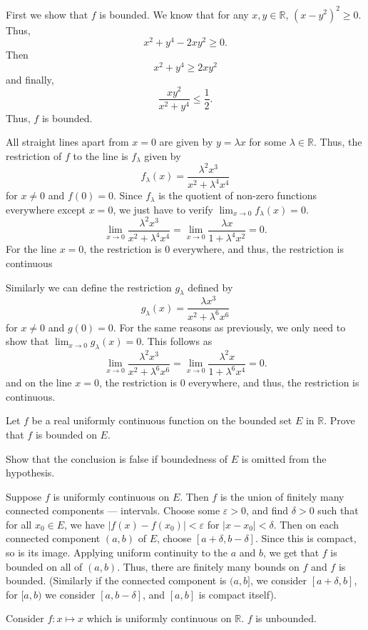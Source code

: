 \documentclass[12 pt, letterpaper]{hmcpset}
\begin{document}
\begin{solution}
	First we show that $f$ is bounded. We know that for any $x, y \in \mathbb{R}$, $(x - y^{2})^{2} \ge 0$. Thus,
	\[
		x^{2} + y^{4} - 2 x y^{2} \ge 0.
	\]
	Then
	\[
		x^{2} + y^{4} \ge 2 x y^{2}
	\]
	and finally,
	\[
		\frac{x y^{2}}{x^{2} + y^{4}} \le \frac{1}{2}.
	\]
	Thus, $f$ is bounded.

	All straight lines apart from $x = 0$ are given by $y = \lambda x$ for some $\lambda \in \mathbb{R}$. Thus, the restriction of $f$ to the line is $f_{\lambda}$ given by
	\[
		f_{\lambda}(x) = \frac{\lambda^{2} x^{3}}{x^{2} + \lambda^{4} x^{4}}
	\]
	for $x \neq 0$ and $f(0) = 0$. Since $f_{\lambda}$ is the quotient of non-zero functions everywhere except $x = 0$, we just have to verify $\lim_{x \to 0} f_{\lambda}(x) = 0$.
	\begin{equation*}
		\lim_{x \to 0} \frac{\lambda^{2} x^{3}}{x^{2} + \lambda^{4} x^{4}} = \lim_{x \to 0} \frac{\lambda x}{1 + \lambda^{4} x^{2}} = 0.
	\end{equation*}
	For the line $x = 0$, the restriction is $0$ everywhere, and thus, the restriction is continuous

	Similarly we can define the restriction $g_{\lambda}$ defined by
	\[
		g_{\lambda}(x) = \frac{\lambda x^{3}}{x^{2} + \lambda^{6} x^{6}}
	\]
	for $x \neq 0$ and $g(0) = 0$. For the same reasons as previously, we only need to show that $\lim_{x \to 0} g_{\lambda}(x) = 0$. This follows as
	\[
		\lim_{x \to 0} \frac{\lambda^{2} x^{3}}{x^{2} + \lambda^{6} x^{6}} = \lim_{x \to 0} \frac{\lambda^{2} x}{1 + \lambda^{6} x^{4}} = 0.
	\]
	and on the line $x = 0$, the restriction is $0$ everywhere, and thus, the restriction is continuous.
\end{solution}

\pagebreak

\begin{problem}
	Let $f$ be a real uniformly continuous function on the bounded set $E$ in $\mathbb{R}$. Prove that $f$ is bounded on $E$.

	Show that the conclusion is false if boundedness of $E$ is omitted from the hypothesis.
\end{problem}

\begin{solution}
	Suppose $f$ is uniformly continuous on $E$. Then $f$ is the union of finitely many connected components --- intervals. Choose some $\varepsilon > 0$, and find $\delta > 0$ such that for all $x_{0} \in E$, we have $\lvert f(x) - f(x_{0}) \rvert < \varepsilon$ for $\lvert x - x_{0} \rvert < \delta$. Then on each connected component $(a, b)$ of $E$, choose $[a + \delta, b - \delta]$. Since this is compact, so is its image. Applying uniform continuity to the $a$ and $b$, we get that $f$ is bounded on all of $(a, b)$. Thus, there are finitely many bounds on $f$ and $f$ is bounded. (Similarly if the connected component is $(a, b]$, we consider $[a + \delta, b]$, for $[a, b)$ we consider $[a, b - \delta]$, and $[a, b]$ is compact itself).

	Consider $f : x \mapsto x$ which is uniformly continuous on $\mathbb{R}$. $f$ is unbounded.
\end{solution}	
\end{document}
